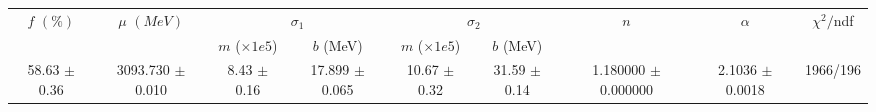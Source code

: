 \begin{tabular}{c|c|cc|cc|c|c||c}
 \multirow{2}{*}{$f$ $(\%)$} & \multirow{2}{*}{$\mu$ $(MeV)$} & \multicolumn{2}{|c|}{$\sigma_1$} & \multicolumn{2}{|c||}{$\sigma_2$}  & \multirow{2}{*}{$n$} & \multirow{2}{*}{$\alpha$} & \multirow{2}{*}{$\chi^2/$ndf} \\
 & & $m$ ($\times1e5$) & $b$ (MeV) & $m$ ($\times1e5$) & $b$ (MeV) & & & \\
\hline
58.63 $\pm$ 0.36 & 3093.730 $\pm$ 0.010 & 8.43 $\pm$ 0.16 & 17.899 $\pm$ 0.065 & 10.67 $\pm$ 0.32 & 31.59 $\pm$ 0.14 & 1.180000 $\pm$ 0.000000 & 2.1036 $\pm$ 0.0018 & 1966/196\\
\end{tabular}
